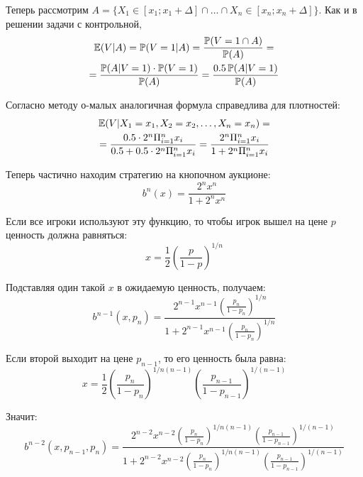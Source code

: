 \begin{enumerate}
Теперь рассмотрим $ A=\{X_{1}\in[x_{1};x_{1}+\Delta] \cap \ldots  \cap X_{n}\in[x_{n};x_{n}+\Delta]\} $. Как и в решении задачи с контрольной,
\begin{multline}
\operatorname{\mathbb{E}}(V|A)=\operatorname{\mathbb{P}}(V=1|A)=\frac{\operatorname{\mathbb{P}}(V=1 \cap A)}{\operatorname{\mathbb{P}}(A)}=\\
=\frac{\operatorname{\mathbb{P}}(A|V=1)\cdot \operatorname{\mathbb{P}}(V=1)}{\operatorname{\mathbb{P}}(A)}=\frac{0.5\operatorname{\mathbb{P}}(A|V=1)}{\operatorname{\mathbb{P}}(A)}
\end{multline}

Согласно методу о-малых аналогичная формула справедлива для плотностей:
\begin{multline}
\operatorname{\mathbb{E}}(V|X_{1}=x_{1},X_{2}=x_{2},\ldots ,X_{n}=x_{n})=\\
=\frac{0.5\cdot 2^{n}\Pi_{i=1}^{n}x_{i}}{0.5+0.5\cdot 2^{n}\Pi_{i=1}^{n}x_{i}}
=\frac{2^{n}\Pi_{i=1}^{n}x_{i}}{1+ 2^{n}\Pi_{i=1}^{n}x_{i}}
\end{multline}

Теперь частично находим стратегию на кнопочном аукционе:
\begin{equation}
b^{n}(x)=\frac{2^{n}x^{n}}{1+2^{n}x^{n}}
\end{equation}

Если все игроки используют эту функцию, то чтобы игрок вышел на цене $ p $ ценность должна равняться:
\begin{equation}
x=\frac{1}{2}\left(\frac{p}{1-p} \right)^{1/n}
\end{equation}

Подставляя один такой $ x $ в ожидаемую ценность, получаем:
\begin{equation}
b^{n-1}(x,p_{n})=\frac{2^{n-1}x^{n-1}\left(\frac{p_{n}}{1-p_{n}} \right)^{1/n}}{1+2^{n-1}x^{n-1}\left(\frac{p_{n}}{1-p_{n}} \right)^{1/n}}
\end{equation}

Если второй выходит на цене $ p_{n-1} $, то его ценность была равна:
\begin{equation}
x=\frac{1}{2}\left(\frac{p_{n}}{1-p_{n}} \right)^{1/n(n-1)}\left(\frac{p_{n-1}}{1-p_{n-1}} \right)^{1/(n-1)}
\end{equation}

Значит:
\begin{equation}
b^{n-2}(x,p_{n-1},p_{n})=\frac{2^{n-2}x^{n-2}\left(\frac{p_{n}}{1-p_{n}} \right)^{1/n(n-1)}\left(\frac{p_{n-1}}{1-p_{n-1}} \right)^{1/(n-1)}}{1+2^{n-2}x^{n-2}\left(\frac{p_{n}}{1-p_{n}} \right)^{1/n(n-1)}\left(\frac{p_{n-1}}{1-p_{n-1}} \right)^{1/(n-1)}}
\end{equation}



\end{enumerate}
